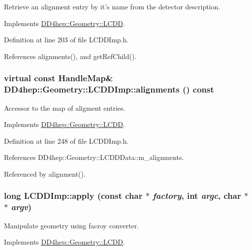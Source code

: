 Retrieve an alignment entry by it's name from the detector description. 

Implements \hyperlink{class_d_d4hep_1_1_geometry_1_1_l_c_d_d_a5661c5a5c9519f58e3044fa66e5393fa}{DD4hep::Geometry::LCDD}.

Definition at line 203 of file LCDDImp.h.

References alignments(), and getRefChild().\hypertarget{class_d_d4hep_1_1_geometry_1_1_l_c_d_d_imp_a3db8df3854b34f1f60a091c135274bc4}{
\subsubsection[{alignments}]{\setlength{\rightskip}{0pt plus 5cm}virtual const {\bf HandleMap}\& DD4hep::Geometry::LCDDImp::alignments () const}}
\label{class_d_d4hep_1_1_geometry_1_1_l_c_d_d_imp_a3db8df3854b34f1f60a091c135274bc4}


Accessor to the map of aligment entries. 

Implements \hyperlink{class_d_d4hep_1_1_geometry_1_1_l_c_d_d_a48553ea87301f9eb1237e41e7e2a0f16}{DD4hep::Geometry::LCDD}.

Definition at line 248 of file LCDDImp.h.

References DD4hep::Geometry::LCDDData::m\_\-alignments.

Referenced by alignment().\hypertarget{class_d_d4hep_1_1_geometry_1_1_l_c_d_d_imp_a3dfdf0180fa0a61067bd1f12fa15ecd6}{
\subsubsection[{apply}]{\setlength{\rightskip}{0pt plus 5cm}long LCDDImp::apply (const char $\ast$ {\em factory}, \/  int {\em argc}, \/  char $\ast$$\ast$ {\em argv})}}
\label{class_d_d4hep_1_1_geometry_1_1_l_c_d_d_imp_a3dfdf0180fa0a61067bd1f12fa15ecd6}


Manipulate geometry using facroy converter. 

Implements \hyperlink{class_d_d4hep_1_1_geometry_1_1_l_c_d_d_ab47f82e5a5bfda6f58624b3553a08c68}{DD4hep::Geometry::LCDD}.

